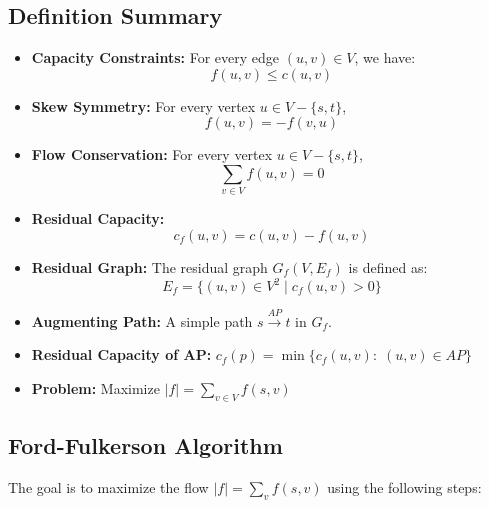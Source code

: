 \subsection{Definition Summary}
\begin{summary}
    \begin{itemize}
        \item \textbf{Capacity Constraints:} For every edge $(u, v) \in V$, we have:
        \[
        f(u, v) \leq c(u, v)
        \]
        \item \textbf{Skew Symmetry:} For every vertex $u \in V - \{s, t\}$,
        \[
        f(u, v) = -f(v, u)
        \]
        \item \textbf{Flow Conservation:} For every vertex $u \in V - \{s, t\}$,
        \[
        \sum_{v \in V} f(u, v) = 0
        \]
        \item \textbf{Residual Capacity:}
        \[
        c_f(u, v) = c(u, v) - f(u, v)
        \]
        \item \textbf{Residual Graph:} The residual graph $G_f(V, E_f)$ is defined as:
        \[
        E_f = \{(u, v) \in V^2 \mid c_f(u, v) > 0\}
        \]
        \item \textbf{Augmenting Path:} A simple path $s \overset{AP}{\rightarrow} t$ in $G_f$.
        \item \textbf{Residual Capacity of AP:} $c_f (p) = \min \{c_f(u,v): \; (u,v) \in AP\}$
        \item \textbf{Problem:} Maximize $|f| = \sum_{v \in V} f(s,v)$
    \end{itemize}
\end{summary}

\subsection{Ford-Fulkerson Algorithm}
\begin{algo}
    The goal is to maximize the flow $|f| = \sum_{v} f(s, v)$ using the following steps:

\end{algo}

\begin{example}
\end{example}

